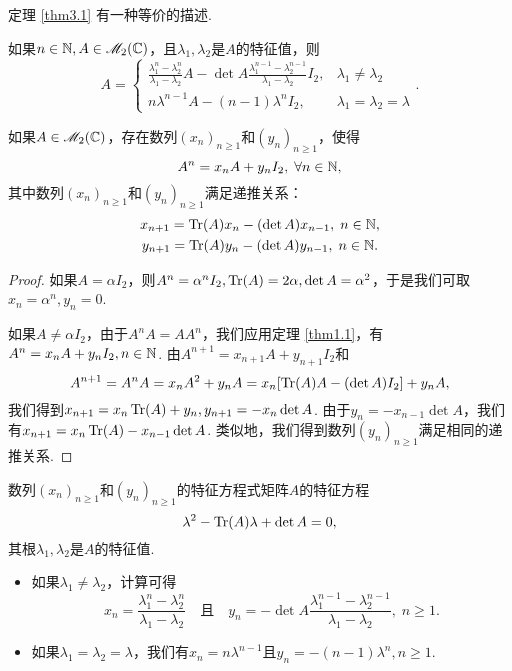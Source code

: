 \begin{remark}
  定理 \ref{thm3.1} 有一种等价的描述.
  \begin{mybox}
    如果$n\in\mathbb N,A\in\mathscr M_2(\mathbb C)$，且$\lambda_1,\lambda_2
    $是$A$的特征值，则
    \[
      A = \begin{cases}
          \frac{\lambda_1^n-\lambda_2^n}
          {\lambda_1-\lambda_2}A - \det A \frac{\lambda_1^{n-1}-\lambda_2^{n-1}}
          {\lambda_1-\lambda_2}I_2, & \lambda_1 \ne \lambda_2 \\
          n\lambda^{n-1}A - (n - 1)\lambda^nI_2, & \lambda_1 = \lambda_2 = \lambda
        \end{cases}.
    \]
  \end{mybox}
\end{remark}

\begin{theorem}
  如果$A\in\mathscr M_2(\mathbb C)$，存在数列$(x_n)_{n\ge1}$和$(y_n)_{n\ge1}$，使得
  \[
    A^n = x_nA + y_nI_2,\; \forall n\in\mathbb N,
  \]
  其中数列$(x_n)_ {n\ge1}$和$(y_n)_{n\ge1}$满足递推关系：
  \begin{gather*}
    x_{n+1} = \operatorname{Tr}(A)x_n - (\det A)x_{n-1},\; n\in\mathbb N, \\
    y_{n+1} = \operatorname{Tr}(A)y_n - (\det A)y_{n-1},\; n\in\mathbb N.
  \end{gather*}
\end{theorem}

\begin{proof}
  如果$A=\alpha I_2$，则$A^n=\alpha^nI_2,\operatorname{Tr}(A)=2\alpha,\det A=\alpha^2$，于是我们可取$x_n=\alpha^n,y_n=0$.

  如果$A\ne\alpha I_2$，由于$A^nA=AA^n$，我们应用定理 \ref{thm1.1}，有$A^n=x_nA+y_nI_2,n\in\mathbb N$. 由$A^{n+1}=x_{n+1}A+y_{n+1}I_2$和
  \[
    A^{n+1} = A^nA = x_nA^2 + y_nA = x_n
    [ \operatorname{Tr}(A)A - (\det A)I_2 ] + y_nA,
  \]
  我们得到$x_{n+1}=x_n\operatorname{Tr}(A)+y_n,y_{n+1}=-x_n\det A$. 由于$y_n=-x_{n-1}\det A$，我们有$x_{n+1}=x_n\operatorname{Tr}(A)-x_{n-1}\det A$. 类似地，我们得到数列$(y_n)_{n\ge1}$满足相同的递推关系.
\end{proof}

\begin{remark}
  数列$(x_n)_{n\ge1}$和$(y_n)_{n\ge1}$的特征方程式矩阵$A$的特征方程
  \[
    \lambda^2 - \operatorname{Tr}(A)\lambda + \det A = 0,
  \]
  其根$\lambda_1,\lambda_2$是$A$的特征值.
  \begin{itemize}
    \item 如果$\lambda_1\ne\lambda_2$，计算可得
    \[
      x_n = \frac{\lambda_1^n-\lambda_2^n}{\lambda_1-\lambda_2}
      \quad \text{且} \quad
      y_n = - \det A \frac{\lambda_1^{n-1}-\lambda_2^{n-1}}
      {\lambda_1-\lambda_2},\; n\ge1.
    \]
    \item 如果$\lambda_1=\lambda_2=\lambda$，我们有$x_n=n\lambda^{n-1}$且$y_n=-(n-1)\lambda^n,n\ge1$.
  \end{itemize}
\end{remark}

